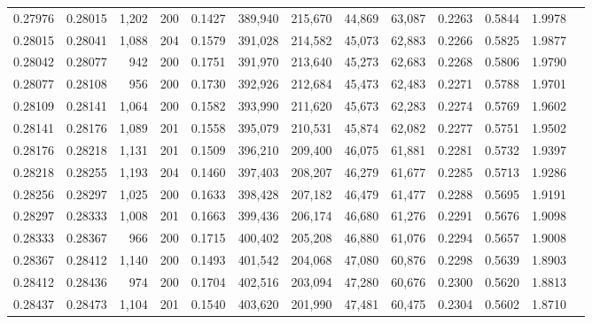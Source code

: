 \begin{tabular}{rrrrrrrrrrrrr}
0.27976 & 0.28015 & 1,202 & 200 &                                     0.1427 & 389,940 & 215,670 &  44,869 &  63,087 & 0.2263 & 0.5844 & 1.9978 \\
0.28015 & 0.28041 & 1,088 & 204 &                                     0.1579 & 391,028 & 214,582 &  45,073 &  62,883 & 0.2266 & 0.5825 & 1.9877 \\
0.28042 & 0.28077 &   942 & 200 &                                     0.1751 & 391,970 & 213,640 &  45,273 &  62,683 & 0.2268 & 0.5806 & 1.9790 \\
0.28077 & 0.28108 &   956 & 200 &                                     0.1730 & 392,926 & 212,684 &  45,473 &  62,483 & 0.2271 & 0.5788 & 1.9701 \\
0.28109 & 0.28141 & 1,064 & 200 &                                     0.1582 & 393,990 & 211,620 &  45,673 &  62,283 & 0.2274 & 0.5769 & 1.9602 \\
0.28141 & 0.28176 & 1,089 & 201 &                                     0.1558 & 395,079 & 210,531 &  45,874 &  62,082 & 0.2277 & 0.5751 & 1.9502 \\
0.28176 & 0.28218 & 1,131 & 201 &                                     0.1509 & 396,210 & 209,400 &  46,075 &  61,881 & 0.2281 & 0.5732 & 1.9397 \\
0.28218 & 0.28255 & 1,193 & 204 &                                     0.1460 & 397,403 & 208,207 &  46,279 &  61,677 & 0.2285 & 0.5713 & 1.9286 \\
0.28256 & 0.28297 & 1,025 & 200 &                                     0.1633 & 398,428 & 207,182 &  46,479 &  61,477 & 0.2288 & 0.5695 & 1.9191 \\
0.28297 & 0.28333 & 1,008 & 201 &                                     0.1663 & 399,436 & 206,174 &  46,680 &  61,276 & 0.2291 & 0.5676 & 1.9098 \\
0.28333 & 0.28367 &   966 & 200 &                                     0.1715 & 400,402 & 205,208 &  46,880 &  61,076 & 0.2294 & 0.5657 & 1.9008 \\
0.28367 & 0.28412 & 1,140 & 200 &                                     0.1493 & 401,542 & 204,068 &  47,080 &  60,876 & 0.2298 & 0.5639 & 1.8903 \\
0.28412 & 0.28436 &   974 & 200 &                                     0.1704 & 402,516 & 203,094 &  47,280 &  60,676 & 0.2300 & 0.5620 & 1.8813 \\
0.28437 & 0.28473 & 1,104 & 201 &                                     0.1540 & 403,620 & 201,990 &  47,481 &  60,475 & 0.2304 & 0.5602 & 1.8710 \\

\end{tabular}
